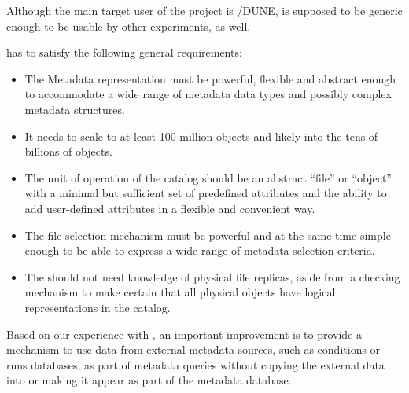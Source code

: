\documentclass[../main-v1.tex]{subfiles}
\begin{document}
Although the main target user of the project is /DUNE,  is supposed to be generic enough to be usable by %
other experiments, as well.   

 has to satisfy the following general requirements: 

\begin{itemize} 
\item 
The Metadata representation must be powerful, flexible and abstract enough to accommodate a wide range of metadata data types and possibly complex metadata structures. 

\item
It needs to scale to at least 100 million objects and likely into the tens of billions of objects. %

\item
The unit of operation of the catalog should be an abstract ``file'' or ``object'' with a  minimal but sufficient set of predefined   attributes and the ability to add user-defined   attributes in a flexible and convenient way. 

\item 
The file selection mechanism must be powerful and at the same time simple enough to be able to express a wide range of metadata selection criteria. 

\item 
The  should not need knowledge of physical file replicas, aside from a checking mechanism to make certain that all physical objects have logical representations in the catalog. 

\end{itemize} 
 

Based on our experience with , an important improvement is to provide a mechanism to use data from external metadata sources, such as conditions or runs databases, as part of metadata queries without copying the external data into or making it appear as part of the metadata database. 
\end{document}

